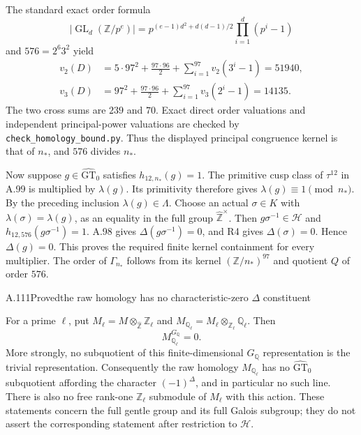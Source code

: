The standard exact order formula
\[
 |\operatorname{GL}_d(\mathbb Z/p^e)|
   =p^{(e-1)d^2+d(d-1)/2}\prod_{i=1}^d(p^i-1)
\]
and $576=2^6 3^2$ yield
\[
 \begin{split}
 v_2(D)&=5\cdot97^2+\frac{97\cdot96}{2}
               +\sum_{i=1}^{97}v_2(3^i-1)=51940,\\
 v_3(D)&=97^2+\frac{97\cdot96}{2}
               +\sum_{i=1}^{97}v_3(2^i-1)=14135.
 \end{split}
\]
The two cross sums are $239$ and $70$. Exact direct order
valuations and independent principal-power valuations are
checked by \texttt{check\_homology\_bound.py}.
Thus the displayed principal congruence kernel is that of
$n_*$, and $576$ divides $n_*$.

Now suppose $g\in\widehat{\mathrm{GT}}_0$ satisfies
$h_{12,n_*}(g)=1$. The primitive cusp class of $\tau^{12}$
in A.99 is multiplied by $\lambda(g)$. Its primitivity
therefore gives $\lambda(g)\equiv1\pmod{n_*}$.
By the preceding inclusion $\lambda(g)\in\Lambda$.
Choose an actual $\sigma\in K$ with
$\lambda(\sigma)=\lambda(g)$, as an equality in the full
group $\widehat{\mathbb Z}^{\times}$.
Then $g\sigma^{-1}\in\mathcal H$ and
$h_{12,576}(g\sigma^{-1})=1$.
A.98 gives $\Delta(g\sigma^{-1})=0$, and R4 gives
$\Delta(\sigma)=0$. Hence $\Delta(g)=0$.
This proves the required finite kernel containment for
every multiplier. The order of $\Gamma_{n_*}$ follows
from its kernel $(\mathbb Z/n_*)^{97}$ and quotient $Q$ of
order $576$.

\begin{statement}{A.111}{Proved}{the raw homology has no characteristic-zero $\Delta$ constituent}
\end{statement}
For a prime $\ell$, put
$M_\ell=M\otimes_{\widehat{\mathbb Z}}\mathbb Z_\ell$
and $M_{\mathbb Q_\ell}=M_\ell\otimes_{\mathbb Z_\ell}\mathbb Q_\ell$.
Then
\[
                 M_{\mathbb Q_\ell}^{G_{\mathbb Q}}=0.
\]
More strongly, no subquotient of this finite-dimensional
$G_{\mathbb Q}$ representation is the trivial representation.
Consequently the raw homology $M_{\mathbb Q_\ell}$ has no
$\widehat{\mathrm{GT}}_0$ subquotient affording the character
$(-1)^\Delta$, and in particular no such line. There is also
no free rank-one $\mathbb Z_\ell$ submodule of $M_\ell$
with this action. These statements concern the full gentle
group and its full Galois subgroup; they do not assert the
corresponding statement after restriction to $\mathcal H$.

